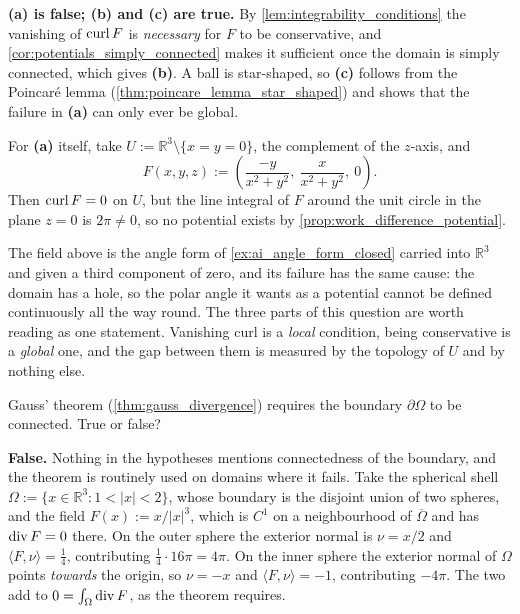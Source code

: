 \begin{answer}
\textbf{(a) is false; (b) and (c) are true.} By \cref{lem:integrability_conditions} the
vanishing of $\operatorname{curl} F$ is \emph{necessary} for $F$ to be conservative, and
\cref{cor:potentials_simply_connected} makes it sufficient once the domain is simply connected,
which gives \textbf{(b)}. A ball is star-shaped, so \textbf{(c)} follows from the Poincaré lemma
(\cref{thm:poincare_lemma_star_shaped}) and shows that the failure in \textbf{(a)} can only ever be global.

For \textbf{(a)} itself, take $U := \mathbb{R}^3\setminus\{x = y = 0\}$, the complement of the
$z$-axis, and
\[F(x,y,z) := \left(\frac{-y}{x^2+y^2},\ \frac{x}{x^2+y^2},\ 0\right).\]
Then $\operatorname{curl} F = 0$ on $U$, but the line integral of $F$ around the unit circle in the plane
$z = 0$ is $2\pi \neq 0$, so no potential exists by \cref{prop:work_difference_potential}.
\end{answer}

\begin{ainote}
The field above is the angle form of \cref{ex:ai_angle_form_closed} carried into
$\mathbb{R}^3$ and given a third component of zero, and its failure has the same cause: the
domain has a hole, so the polar angle it wants as a potential cannot be defined continuously all
the way round. The three parts of this question are worth reading as one statement. Vanishing
curl is a \emph{local} condition, being conservative is a \emph{global} one, and the gap between
them is measured by the topology of $U$ and by nothing else.
\end{ainote}

\begin{question}
\label{q:quiz_q12}
Gauss' theorem (\cref{thm:gauss_divergence}) requires the boundary $\partial\Omega$ to be
connected. True or false?
\end{question}

\begin{answer}
\textbf{False.} Nothing in the hypotheses mentions connectedness of the boundary, and the
theorem is routinely used on domains where it fails. Take the spherical shell
$\Omega := \{x \in \mathbb{R}^3 : 1 < \lvert x\rvert < 2\}$, whose boundary is the disjoint
union of two spheres, and the field $F(x) := x/\lvert x\rvert^3$, which is $C^1$ on a
neighbourhood of $\overline\Omega$ and has $\operatorname{div} F = 0$ there. On the outer sphere the exterior
normal is $\nu = x/2$ and $\langle F,\nu\rangle = \tfrac14$, contributing
$\tfrac14 \cdot 16\pi = 4\pi$. On the inner sphere the exterior normal of $\Omega$ points
\emph{towards} the origin, so $\nu = -x$ and $\langle F,\nu\rangle = -1$, contributing
$-4\pi$. The two add to $0 = \int_\Omega\operatorname{div} F$, as the theorem requires.
\end{answer}

